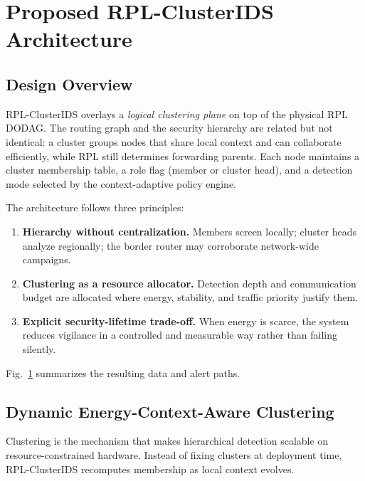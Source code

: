 \section{Proposed RPL-ClusterIDS Architecture}
\label{sec:arch}

\subsection{Design Overview}
RPL-ClusterIDS overlays a \emph{logical clustering plane} on top of the physical RPL DODAG.
The routing graph and the security hierarchy are related but not identical: a cluster groups nodes that share local context and can collaborate efficiently, while RPL still determines forwarding parents.
Each node maintains a cluster membership table, a role flag (member or cluster head), and a detection mode selected by the context-adaptive policy engine.

The architecture follows three principles:
\begin{enumerate}
  \item \textbf{Hierarchy without centralization.} Members screen locally; cluster heads analyze regionally; the border router may corroborate network-wide campaigns.
  \item \textbf{Clustering as a resource allocator.} Detection depth and communication budget are allocated where energy, stability, and traffic priority justify them.
  \item \textbf{Explicit security-lifetime trade-off.} When energy is scarce, the system reduces vigilance in a controlled and measurable way rather than failing silently.
\end{enumerate}

Fig.~\ref{fig:arch} summarizes the resulting data and alert paths.

\begin{figure}[!t]
  \centering
  \resizebox{\linewidth}{!}{}
  \caption{\CaptionFigOne}
  \label{fig:arch}
\end{figure}

\subsection{Dynamic Energy-Context-Aware Clustering}
Clustering is the mechanism that makes hierarchical detection scalable on resource-constrained hardware.
Instead of fixing clusters at deployment time, RPL-ClusterIDS recomputes membership as local context evolves.


